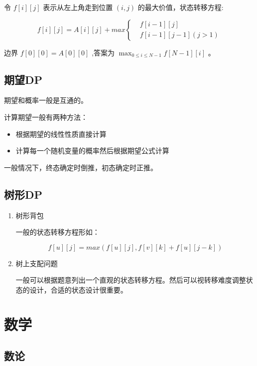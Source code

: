 \documentclass[11pt]{article}
\begin{document}
令 $f[i][j]$ 表示从左上角走到位置 $(i,j)$ 的最大价值，状态转移方程:

$$
f[i][j]=A[i][j]+max\left\{\begin{aligned}
&f[i-1][j]\\
&f[i-1][j-1] (j>1)
\end{aligned}\right.
$$

边界 $f[0][0]=A[0][0]$ ,答案为 $\max_{0 \leq i \leq N-1} f[N-1][i]$ 。

\subsection{期望DP}
\label{sec-2-4}

期望和概率一般是互通的。

计算期望一般有两种方法：

\begin{itemize}
\item 根据期望的线性性质直接计算
\item 计算每一个随机变量的概率然后根据期望公式计算
\end{itemize}

一般情况下，终态确定时倒推，初态确定时正推。

\subsection{树形DP}
\label{sec-2-5}
\begin{enumerate}
\item 树形背包
\label{sec-2-5-0-1}

一般的状态转移方程形如：

$$
f[u][j] = max(f[u][j], f[v][k] + f[u][j - k])
$$

\item 树上支配问题
\label{sec-2-5-0-2}

一般可以根据题意列出一个直观的状态转移方程。然后可以视转移难度调整状态的设计，合适的状态设计很重要。
\end{enumerate}

\section{数学}
\label{sec-3}
\subsection{数论}
\label{sec-3-1}
\end{document}

